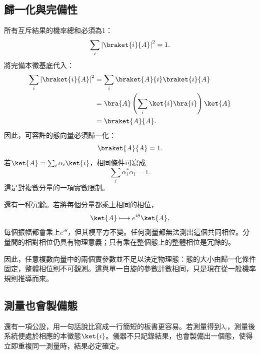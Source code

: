 \subsection{歸一化與完備性}

所有互斥結果的機率總和必須為1：
\begin{equation}
\sum_i\left|\braket{i}{A}\right|^2=1.
\label{eq:probability-normalization}
\end{equation}
將完備本徵基底代入：
\begin{align}
\sum_i\left|\braket{i}{A}\right|^2
 &=\sum_i\braket{A}{i}\braket{i}{A}\\
 &=\bra{A}\left(\sum_i\ket{i}\bra{i}\right)\ket{A}\\
 &=\braket{A}{A}.
\end{align}
因此，可容許的態向量必須歸一化：
\begin{equation}
\braket{A}{A}=1.
\label{eq:state-normalization}
\end{equation}
若\(\ket{A}=\sum_i\alpha_i\ket{i}\)，相同條件可寫成
\begin{equation}
\sum_i\alpha_i^*\alpha_i=1.
\label{eq:component-normalization}
\end{equation}
這是對複數分量的一項實數限制。

\begin{classroomqa}
\end{classroomqa}

還有一種冗餘。若將每個分量都乘上相同的相位，
\begin{equation}
\ket{A}\longmapsto e^{i\theta}\ket{A},
\label{eq:l3-global-phase}
\end{equation}
每個振幅都會乘上\(e^{i\theta}\)，但其模平方不變。任何測量都無法測出這個共同相位。分量間的相對相位仍具有物理意義；只有乘在整個態上的整體相位是冗餘的。

因此，任意複數向量中的兩個實參數並不足以決定物理態：態的大小由歸一化條件固定，整體相位則不可觀測。這與單一自旋的參數計數相同，只是現在從一般機率規則推導而來。

\subsection{測量也會製備態}

還有一項公設，用一句話說比寫成一行簡短的板書更容易。若測量得到\(\lambda_i\)，測量後系統便處於相應的本徵態\(\ket{i}\)。儀器不只記錄結果，也會製備出一個態，使得立即重複同一測量時，結果必定確定。


